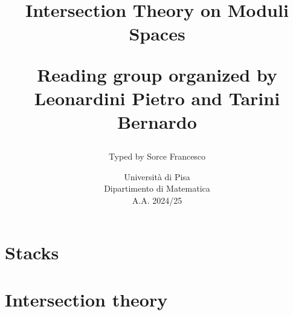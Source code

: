 \documentclass[a4paper]{report}
\title{{\Huge\bf Intersection Theory on Moduli Spaces}
\vspace{0.7cm}

\Large Reading group organized by\\ Leonardini Pietro and Tarini Bernardo\vfill}
\author{\Large Typed by Sorce Francesco}
\date{\vspace{1cm} Università di Pisa\\
Dipartimento di Matematica\\
A.A. 2024/25}
\begin{document}
\maketitle





\tableofcontents
\newpage

\part{Stacks}




\part{Intersection theory}





\appendix


\end{document}
